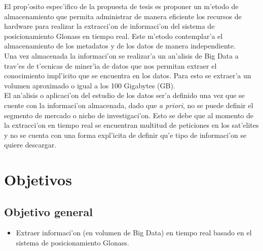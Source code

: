 El prop'osito espec'ifico de la propuesta de tesis es proponer un m'etodo de almacenamiento que permita administrar de manera eficiente los recursos de hardware para realizar la extracci'on de informaci'on del sistema de posicionamiento Glonass en tiempo real. Este m'etodo contemplar'a el almacenamiento de los metadatos y de los datos de manera independiente.\\

Una vez almacenada la informaci'on se realizar'a un an'alisis de Big Data a trav'es de t'ecnicas de miner'ia de datos que nos permitan extraer el conocimiento impl'icito que se encuentra en los datos. Para esto se extraer'a un volumen aproximado o igual a los 100 Gigabytes (GB).\\

El an'alisis o aplicaci'on del estudio de los datos ser'a definido una vez que se cuente con la informaci'on almacenada, dado que \emph{a priori}, no se puede definir el segmento de mercado o nicho de investigaci'on. Esto se debe que al momento de la extracci'on en tiempo real se encuentran multitud de peticiones en los sat'elites y no se cuenta con una forma expl'icita de definir qu'e tipo de informaci'on se quiere descargar.

\section{Objetivos}
\subsection{Objetivo general}
\noindent
\begin{itemize}
\item Extraer informaci'on (en volumen de Big Data) en tiempo real basado en el sistema de posicionamiento Glonass.
\end{itemize}

